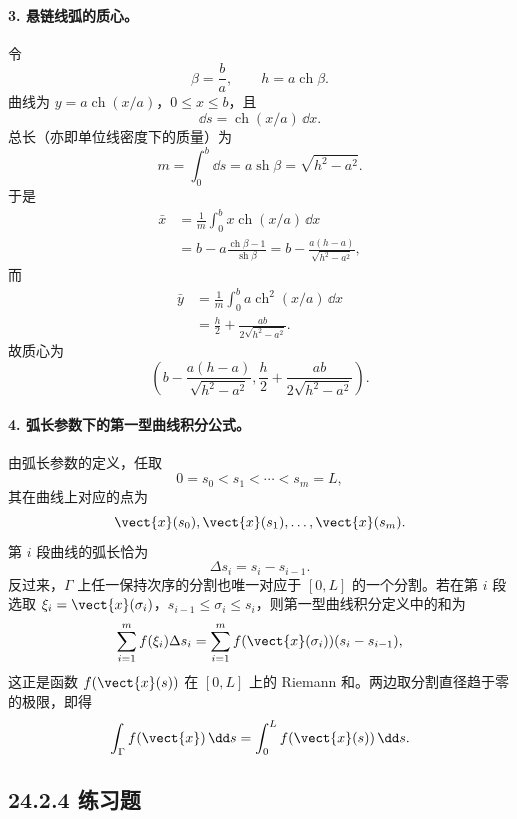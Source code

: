 \paragraph{3. 悬链线弧的质心。}
\begin{xsolution}
令
\[
  \beta=\frac ba,
  \qquad h=a\operatorname{ch}\beta.
\]
曲线为 $y=a\operatorname{ch}(x/a)$，$0\le x\le b$，且
\[
  \dd s=\operatorname{ch}(x/a)\,\dd x.
\]
总长（亦即单位线密度下的质量）为
\[
  m=\int_0^b\dd s=a\operatorname{sh}\beta
   =\sqrt{h^2-a^2}.
\]
于是
\begin{align*}
  \bar x
  &=\frac1m\int_0^b x\operatorname{ch}(x/a)\,\dd x\\
  &=b-a\frac{\operatorname{ch}\beta-1}{\operatorname{sh}\beta}
   =b-\frac{a(h-a)}{\sqrt{h^2-a^2}},
\end{align*}
而
\begin{align*}
  \bar y
  &=\frac1m\int_0^b a\operatorname{ch}^2(x/a)\,\dd x\\
  &=\frac h2+\frac{ab}{2\sqrt{h^2-a^2}}.
\end{align*}
故质心为
\[
  \left(
  b-\frac{a(h-a)}{\sqrt{h^2-a^2}},
  \frac h2+\frac{ab}{2\sqrt{h^2-a^2}}
  \right).
\]
\end{xsolution}

\paragraph{4. 弧长参数下的第一型曲线积分公式。}
\begin{xsolution}
由弧长参数的定义，任取
\[
  0=s_0<s_1<\cdots<s_m=L,
\]
其在曲线上对应的点为
\[
  \vect{x}(s_0),\vect{x}(s_1),\ldots,\vect{x}(s_m).
\]
第 $i$ 段曲线的弧长恰为
\[
  \Delta s_i=s_i-s_{i-1}.
\]
反过来，$\Gamma$ 上任一保持次序的分割也唯一对应于 $[0,L]$ 的一个分割。若在第 $i$ 段选取
$\xi_i=\vect{x}(\sigma_i)$，$s_{i-1}\le\sigma_i\le s_i$，则第一型曲线积分定义中的和为
\[
  \sum_{i=1}^m f(\xi_i)\Delta s_i
  =\sum_{i=1}^m f(\vect{x}(\sigma_i))(s_i-s_{i-1}),
\]
这正是函数 $f(\vect{x}(s))$ 在 $[0,L]$ 上的 Riemann 和。两边取分割直径趋于零的极限，即得
\[
  \int_\Gamma f(\vect{x})\,\dd s
  =\int_0^L f(\vect{x}(s))\,\dd s.
\]
\end{xsolution}

\subsection*{24.2.4 练习题}

